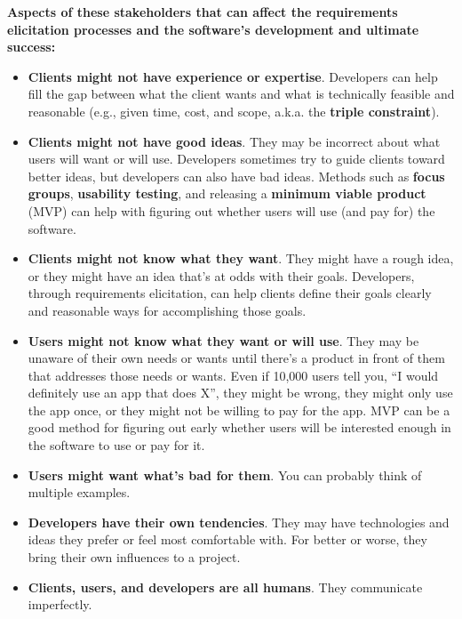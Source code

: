 \spacer
\pagebreak
\noindent\textbf{Aspects of these stakeholders that can affect the requirements elicitation processes and the software's development and ultimate success:}\\

\begin{itemize}
\item{\marginpar{\tripleConstraintDef\margindivider}\marginpar{\focusGroupDef\margindivider}\marginpar{\usabilityTestingDef\margindivider}\marginpar{\mvpDef}\textbf{Clients might not have experience or expertise}. Developers can help fill the gap between what the client wants and what is technically feasible and reasonable (e.g., given time, cost, and scope, a.k.a. the \textbf{triple constraint}).}\\
\item{\textbf{Clients might not have good ideas}. They may be incorrect about what users will want or will use. Developers sometimes try to guide clients toward better ideas, but developers can also have bad ideas. Methods such as \textbf{focus groups}, \textbf{usability testing}, and releasing a \textbf{minimum viable product} (MVP) can help with figuring out whether users will use (and pay for) the software.}\\
\item{\textbf{Clients might not know what they want}. They might have a rough idea, or they might have an idea that's at odds with their goals. Developers, through requirements elicitation, can help clients define their goals clearly and reasonable ways for accomplishing those goals.}\\
\item{\textbf{Users might not know what they want or will use}. They may be unaware of their own needs or wants until there's a product in front of them that addresses those needs or wants. Even if 10,000 users tell you, ``I would definitely use an app that does X'', they might be wrong, they might only use the app once, or they might not be willing to pay for the app. MVP can be a good method for figuring out early whether users will be interested enough in the software to use or pay for it.}\\
\item{\textbf{Users might want what's bad for them}. You can probably think of multiple examples.}\\
\item{\textbf{Developers have their own tendencies}. They may have technologies and ideas they prefer or feel most comfortable with. For better or worse, they bring their own influences to a project.}\\
\item{\textbf{Clients, users, and developers are all humans}. They communicate imperfectly.}\\
\end{itemize}

